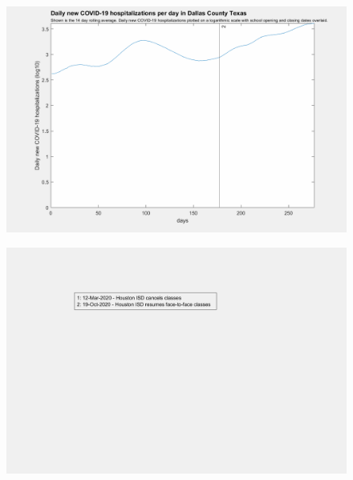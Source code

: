 \documentclass[]{article}
\begin{document}
\begin{figure}[!h]
	\includegraphics[width=\linewidth]{images/dallas_hospitalizations_school_log.png}
	\caption{}
	\label{fig:images/dallas_hospitalizations_school_logLabel}
\end{figure}

\begin{figure}[!h]
	\includegraphics[width=\linewidth]{legends/harris_school_legend.png}
	\caption{}
	\label{fig:legends/harris_school_legendLabel}
\end{figure}
\end{document}
